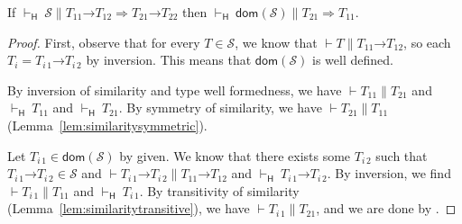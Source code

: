 \documentclass[9pt]{extarticle}
\newcommand{\ottnt}[1]{\mathit{#1}}
\newcommand{\ottmv}[1]{\mathit{#1}}
\newcommand{\ottsym}[1]{#1}
\begin{document}
{\begin{lemma}
  \label{lem:heedfuldomwf}
  If $ \mathord{  \vdash _{  \mathsf{H}  } }~ \mathcal{S}   \mathrel{\parallel}    \ottnt{T_{{\mathrm{11}}}} \mathord{ \rightarrow } \ottnt{T_{{\mathrm{12}}}}   \Rightarrow   \ottnt{T_{{\mathrm{21}}}} \mathord{ \rightarrow } \ottnt{T_{{\mathrm{22}}}}  $ then $ \mathord{  \vdash _{  \mathsf{H}  } }~  \mathsf{dom} ( \mathcal{S} )    \mathrel{\parallel}   \ottnt{T_{{\mathrm{21}}}}  \Rightarrow  \ottnt{T_{{\mathrm{11}}}} $.
\begin{proof}
    First, observe that for every $ \ottnt{T}  \in  \mathcal{S} $, we know that $\vdash  \ottnt{T}  \mathrel{\parallel}   \ottnt{T_{{\mathrm{11}}}} \mathord{ \rightarrow } \ottnt{T_{{\mathrm{12}}}} $, so each $\ottnt{T_{\ottmv{i}}}  \ottsym{=}   \ottnt{T_{\ottmv{i}\,{\mathrm{1}}}} \mathord{ \rightarrow } \ottnt{T_{\ottmv{i}\,{\mathrm{2}}}} $ by inversion. This
    means that $ \mathsf{dom} ( \mathcal{S} ) $ is well defined.

    By inversion of similarity and type well formedness, we have $\vdash  \ottnt{T_{{\mathrm{11}}}}  \mathrel{\parallel}  \ottnt{T_{{\mathrm{21}}}}$ and $ \mathord{  \vdash _{  \mathsf{H}  } }~ \ottnt{T_{{\mathrm{11}}}} $ and $ \mathord{  \vdash _{  \mathsf{H}  } }~ \ottnt{T_{{\mathrm{21}}}} $. By symmetry of
    similarity, we have $\vdash  \ottnt{T_{{\mathrm{21}}}}  \mathrel{\parallel}  \ottnt{T_{{\mathrm{11}}}}$
    (Lemma~\ref{lem:similaritysymmetric}).

    Let $ \ottnt{T_{\ottmv{i}\,{\mathrm{1}}}}  \in   \mathsf{dom} ( \mathcal{S} )  $ by given. We know that there exists some
    $\ottnt{T_{\ottmv{i}\,{\mathrm{2}}}}$ such that $  \ottnt{T_{\ottmv{i}\,{\mathrm{1}}}} \mathord{ \rightarrow } \ottnt{T_{\ottmv{i}\,{\mathrm{2}}}}   \in  \mathcal{S} $ and $\vdash   \ottnt{T_{\ottmv{i}\,{\mathrm{1}}}} \mathord{ \rightarrow } \ottnt{T_{\ottmv{i}\,{\mathrm{2}}}}   \mathrel{\parallel}   \ottnt{T_{{\mathrm{11}}}} \mathord{ \rightarrow } \ottnt{T_{{\mathrm{12}}}} $ and $ \mathord{  \vdash _{  \mathsf{H}  } }~  \ottnt{T_{\ottmv{i}\,{\mathrm{1}}}} \mathord{ \rightarrow } \ottnt{T_{\ottmv{i}\,{\mathrm{2}}}}  $. By inversion, we find $\vdash  \ottnt{T_{\ottmv{i}\,{\mathrm{1}}}}  \mathrel{\parallel}  \ottnt{T_{{\mathrm{11}}}}$ and $ \mathord{  \vdash _{  \mathsf{H}  } }~ \ottnt{T_{\ottmv{i}\,{\mathrm{1}}}} $. By transitivity of similarity
    (Lemma~\ref{lem:similaritytransitive}), we have $\vdash  \ottnt{T_{\ottmv{i}\,{\mathrm{1}}}}  \mathrel{\parallel}  \ottnt{T_{{\mathrm{21}}}}$, and we are done by .
  \end{proof}
\end{lemma}

}
\end{document}
